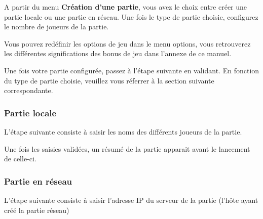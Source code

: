 	A partir du menu \textbf{Création d'une partie}, vous avez le choix entre créer une partie locale ou une partie en réseau.
Une fois le type de partie choisie, configurez le nombre de joueurs de la partie. 


Vous pouvez redéfinir les options de jeu dans le menu options, vous retrouverez les différentes significations des bonus de jeu dans l'annexe de ce manuel.


Une fois votre partie configurée, passez à l'étape suivante en validant. En fonction du type de partie choisie, veuillez vous réferrer à la section suivante correspondante.

	\subsubsection{Partie locale}
		L'étape suivante consiste à saisir les noms des différents joueurs de la partie. 
		
		Une fois les saisies validées, un résumé de la partie apparait avant le lancement de celle-ci.
		
	\subsubsection{Partie en réseau}
		L'étape suivante consiste à saisir l'adresse IP du serveur de la partie (l'hôte ayant créé la partie réseau)
		
	
